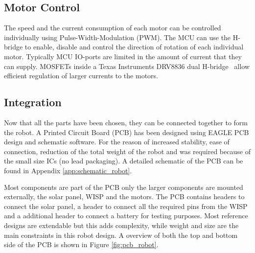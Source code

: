 \subsection{Motor Control}
\label{sec:dai_motor_control}

The speed and the current consumption of each motor can be controlled individually using Pulse-Width-Modulation (PWM).
The MCU can use the H-bridge to enable, disable and control the direction of rotation of each individual motor.
Typically MCU IO-ports are limited in the amount of current that they can supply.
MOSFETs inside a Texas Instruments DRV8836 dual H-bridge~\cite{drv8836_2017} allow efficient regulation of larger currents to the motors.

\subsection{Integration}

Now that all the parts have been chosen, they can be connected together to form the robot.
A Printed Circuit Board (PCB) has been designed using EAGLE PCB design and schematic software.
For the reason of increased stability, ease of connection, reduction of the total weight of the robot and was required because of the small size ICs (no lead packaging).
A detailed schematic of the PCB can be found in Appendix \ref{app:schematic_robot}.

Most components are part of the PCB only the larger components are mounted externally, the solar panel, WISP and the motors.
The PCB contains headers to connect the solar panel, a header to connect all the required pins from the WISP and a additional header to connect a battery for testing purposes.
Most reference designs are extendable but this adds complexity, while weight and size are the main constraints in this robot design.
A overview of both the top and bottom side of the PCB is shown in Figure \ref{fig:pcb_robot}.



